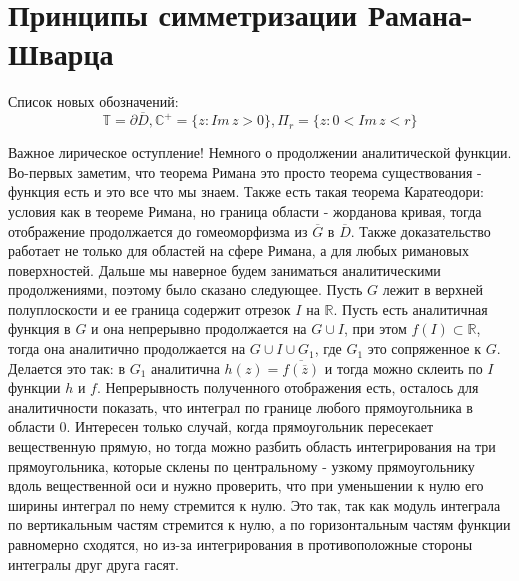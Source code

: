 \documentclass[12pt,a4paper]{article} %
\newcommand{\R}{\mathbb{R}}
\newcommand{\Co}{\mathbb{C}}
\begin{document}
	\section{Принципы симметризации Рамана-Шварца}
	Список новых обозначений: $$\mathbb{T}=\partial\overline{D}, \Co^{+}=\{z:Im\,z>0\}, \Pi_r=\{z:0<Im\,z<r\}$$\par
	Важное лирическое оступление! Немного о продолжении аналитической функции. Во-первых заметим, что теорема Римана это просто теорема существования - функция есть и это все что мы знаем. Также есть такая теорема Каратеодори: условия как в теореме Римана, но граница области - жорданова кривая, тогда отображение продолжается до гомеоморфизма из $\overline{G}$ в $\overline{D}$. Также доказательство работает не только для областей на сфере Римана, а для любых римановых поверхностей. Дальше мы наверное будем заниматься аналитическими продолжениями, поэтому было сказано следующее. Пусть $G$ лежит в верхней полуплоскости и ее граница содержит отрезок $I$ на $\R$. Пусть есть аналитичная функция в $G$ и она непрерывно продолжается на $G\cup I$, при этом $f(I)\subset\R$, тогда она аналитично продолжается на $G\cup I\cup G_1$, где $G_1$ это сопряженное к $G$. Делается это так: в $G_1$ аналитична $h(z)=\overline{f(\overline{z})}$ и тогда можно склеить по $I$ функции $h$ и $f$. Непрерывность полученного отображения есть, осталось для аналитичности показать, что интеграл по границе любого прямоугольника в области 0. Интересен только случай, когда прямоугольник пересекает вещественную прямую, но тогда можно разбить область интегрирования на три прямоугольника, которые склены по центральному - узкому прямоугольнику вдоль вещественной оси и нужно проверить, что при уменьшении к нулю его ширины интеграл по нему стремится к нулю. Это так, так как модуль интеграла по вертикальным частям стремится к нулю, а по горизонтальным частям функции равномерно сходятся, но из-за интегрирования в противоположные стороны интегралы друг друга гасят.
	
\end{document}
